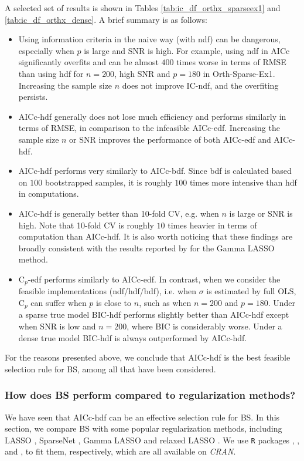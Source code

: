 A selected set of results is shown in Tables \ref{tab:ic_df_orthx_sparseex1} and \ref{tab:ic_df_orthx_dense}. A brief summary is as follows:
\begin{itemize}
	\item Using information criteria in the naive way (with ndf) can be dangerous, especially when $p$ is large and SNR is high. For example, using ndf in AICc significantly overfits and can be almost $400$ times worse in terms of RMSE than using hdf for $n=200$, high SNR and $p=180$ in Orth-Sparse-Ex1. Increasing the sample size $n$ does not improve IC-ndf, and the overfiting persists.
	\item AICc-hdf generally does not lose much efficiency and performs similarly in terms of RMSE, in comparison to the infeasible AICc-edf. Increasing the sample size $n$ or SNR improves the performance of both AICc-edf and AICc-hdf. 
	\item AICc-hdf performs very similarly to AICc-bdf. Since bdf is calculated based on $100$ bootstrapped samples, it is roughly $100$ times more intensive than hdf in computations. 
	\item AICc-hdf is generally better than 10-fold CV, e.g. when $n$ is large or SNR is high. Note that 10-fold CV is roughly $10$ times heavier in terms of computation than AICc-hdf. It is also worth noticing that these findings are broadly consistent with the results reported by \citet{Taddy2017} for the Gamma LASSO method. 
	\item C$_p$-edf performs similarly to AICc-edf. In contrast, when we consider the feasible implementations (ndf/hdf/bdf), i.e. when $\sigma$ is estimated by full OLS, C$_p$ can suffer when $p$ is close to $n$, such as when $n=200$ and $p=180$. Under a sparse true model BIC-hdf performs slightly better than AICc-hdf except when SNR is low and $n=200$, where BIC is considerably worse. Under a dense true model BIC-hdf is always outperformed by AICc-hdf. 
\end{itemize}
For the reasons presented above, we conclude that AICc-hdf is the best feasible selection rule for BS, among all that have been considered.






\subsubsection{How does BS perform compared to regularization methods?}
\label{sec:bs_regu}
We have seen that AICc-hdf can be an effective selection rule for BS. In this section, we compare BS with some popular regularization methods, including LASSO \citep{Tibshirani1996}, SparseNet \citep{Mazumder2011}, Gamma LASSO \citep{Taddy2017} and relaxed LASSO \citep{Meinshausen2007}. We use {\tt{R}} packages  \citep{Friedman2010},  \citep{Mazumder2011},  \citep{Taddy2017} and  \citep{Meinshausen2012}, to fit them, respectively, which are all available on \textit{CRAN}.

